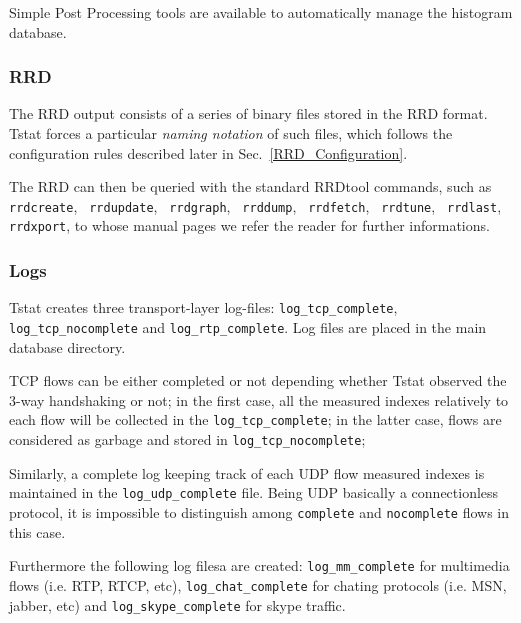 \documentclass[11pt]{article}
\begin{document}
Simple \textsf{Post Processing} tools are available to automatically manage the histogram
database.

\subsubsection{RRD\label{RRD}}


The RRD output consists of a series of binary files stored in the RRD format.
Tstat forces a particular \textit{naming notation} of such files, which follows
the configuration rules described later in Sec.~\ref{RRD_Configuration}.



The RRD can then be queried with the standard RRDtool commands, such as
\texttt{rrdcreate}, \texttt{ rrdupdate},  \texttt{ rrdgraph}, \texttt{ rrddump}, \texttt{ rrdfetch}, 
\texttt{ rrdtune}, \texttt{ rrdlast}, \texttt{ rrdxport}, to whose manual pages we refer 
the reader for further informations.

\subsubsection{Logs\label{Logs}}


Tstat creates three transport-layer log-files: \texttt{log\_tcp\_complete},
\texttt{log\_tcp\_nocomplete} and \texttt{log\_rtp\_complete}. 
Log files are placed in the main database directory.



TCP flows can be either completed or not depending whether Tstat observed the
3-way handshaking or not; in the first case, all the measured indexes relatively
to each flow will be collected in the \texttt{log\_tcp\_complete}; in the latter
case,  flows are considered as garbage and stored in \texttt{log\_tcp\_nocomplete};



Similarly, a complete log keeping track of each UDP flow measured indexes is
maintained in the \texttt{log\_udp\_complete} file. Being UDP basically a
connectionless protocol, it is impossible to distinguish among \texttt{complete} and
\texttt{nocomplete} flows in this case.



Furthermore the following log filesa are created: \texttt{log\_mm\_complete} for multimedia flows
(i.e. RTP, RTCP, etc), \texttt{log\_chat\_complete} for chating protocols (i.e. MSN, jabber, etc) and
\texttt{log\_skype\_complete} for skype traffic.
\end{document}
